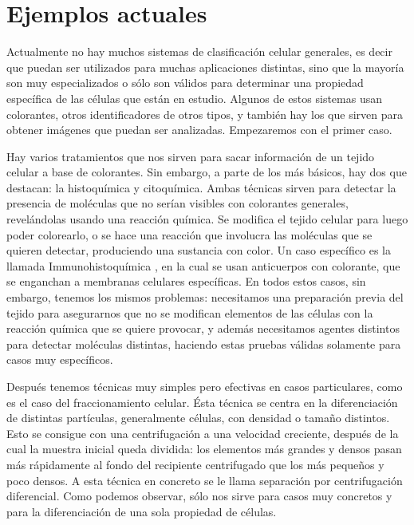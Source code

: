 \documentclass[a4paper, 12pt, UTF8]{article}
\begin{document}
\section{Ejemplos actuales}
Actualmente no hay muchos sistemas de clasificación celular generales, es decir que puedan ser utilizados para muchas aplicaciones distintas, sino que la mayoría son muy especializados o sólo son válidos para determinar una propiedad específica de las células que están en estudio. Algunos de estos sistemas usan colorantes, otros identificadores de otros tipos, y también hay los que sirven para obtener imágenes que puedan ser analizadas. Empezaremos con el primer caso.

Hay varios tratamientos que nos sirven para sacar información de un tejido celular a base de colorantes. Sin embargo, a parte de los más básicos, hay dos que destacan: la histoquímica y citoquímica. Ambas técnicas sirven para detectar la presencia de moléculas que no serían visibles con colorantes generales, revelándolas usando una reacción química. Se modifica el tejido celular para luego poder colorearlo, o se hace una reacción que involucra las moléculas que se quieren detectar, produciendo una sustancia con color. Un caso específico es la llamada Immunohistoquímica , en la cual se usan anticuerpos con colorante, que se enganchan a membranas celulares específicas. En todos estos casos, sin embargo, tenemos los mismos problemas: necesitamos una preparación previa del tejido para asegurarnos que no se modifican elementos de las células con la reacción química que se quiere provocar, y además necesitamos agentes distintos para detectar moléculas distintas, haciendo estas pruebas válidas solamente para casos muy específicos. 

Después tenemos técnicas muy simples pero efectivas en casos particulares, como es el caso del fraccionamiento celular. Ésta técnica se centra en la diferenciación de distintas partículas, generalmente células, con densidad o tamaño distintos. Esto se consigue con una centrifugación a una velocidad creciente, después de la cual la muestra inicial queda dividida: los elementos más grandes y densos pasan más rápidamente al fondo del recipiente centrifugado que los más pequeños y poco densos. A esta técnica en concreto se le llama separación por centrifugación diferencial. Como podemos observar, sólo nos sirve para casos muy concretos y para la diferenciación de una sola propiedad de células.
\end{document}
